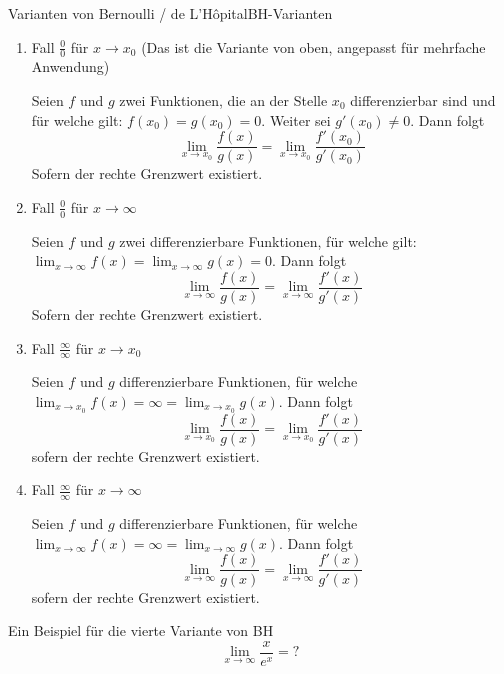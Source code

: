  \begin{satz}
    {Varianten von Bernoulli / de L'Hôpital}{BH-Varianten}
    \begin{enumerate}
        \item Fall $\frac{0}{0}$ für $x \rightarrow x_0$ (Das ist die Variante von oben, angepasst für mehrfache Anwendung)
        
        Seien $f$ und $g$ zwei Funktionen, die an der Stelle $x_0$ differenzierbar sind und für welche gilt: $f(x_0) = g(x_0) = 0$. Weiter sei $g'(x_0) \neq 0$. Dann folgt
        \[
        \lim_{{x \to x_0}} \frac{f(x)}{g(x)} = \lim_{{x \to x_0}}\frac{f'(x_0)}{g'(x_0)}
        \]
        Sofern der rechte Grenzwert existiert.
        \item Fall $\frac{0}{0}$ für $x \rightarrow \infty$
        
        Seien $f$ und $g$ zwei differenzierbare Funktionen, für welche gilt: $\lim_{{x \to \infty}} f(x) = \lim_{{x \to \infty}} g(x) = 0$. Dann folgt
        \[
        \lim_{{x \to \infty}} \frac{f(x)}{g(x)} = \lim_{{x \to \infty}} \frac{f'(x)}{g'(x)}
        \]
        Sofern der rechte Grenzwert existiert.
        \item Fall $\frac{\infty}{\infty}$ für $x \rightarrow x_0$ 
        
        Seien $f$ und $g$ differenzierbare Funktionen, für welche $\lim_{{x \to x_0}} f(x) = \infty = \lim_{{x \to x_0}} g(x)$. Dann folgt 
         $$\lim_{{x \to x_0}} \frac{f(x)}{g(x)} =\lim_{{x \to x_0}} \frac{f'(x)}{g'(x)}$$
         sofern der rechte Grenzwert existiert.



        \item Fall $\frac{\infty}{\infty}$ für $x \rightarrow \infty$ 
        
        Seien $f$ und $g$ differenzierbare Funktionen, für welche $\lim_{{x \to \infty}} f(x) = \infty = \lim_{{x \to \infty}} g(x)$. Dann folgt 
         $$\lim_{{x \to \infty}} \frac{f(x)}{g(x)} =\lim_{{x \to \infty}} \frac{f'(x)}{g'(x)}$$
         sofern der rechte Grenzwert existiert.


    \end{enumerate}
 \end{satz}

 \begin{bsp}
    {Ein Beispiel für die vierte Variante von BH}{}
    \[
        \lim_{{x \to \infty}} \frac{x}{e^x} =?
        \]

        \vspace{2cm}


 \end{bsp}


